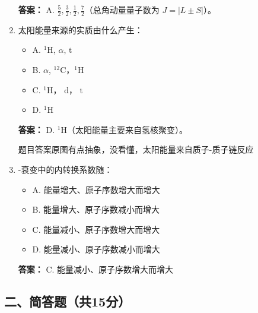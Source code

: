 \documentclass{article}
\begin{document}
\begin{enumerate}[label=\arabic*.]
    \textbf{答案：} A. $\frac{5}{2}, \frac{3}{2}, \frac{1}{2}, \frac{7}{2}$（总角动量量子数为 \( J = |L \pm S| \)）。
    
    \item 太阳能量来源的实质由什么产生：
    \begin{itemize}[label={},leftmargin=2em]
        \item A. $^1\text{H}$, $\alpha$, $\text{t}$
        \item B. $\alpha$, $^{12}\text{C}$，$^1\text{H}$ 
        \item C. $^1\text{H}$， $\text{d}$， $\text{t}$
        \item D. $^1\text{H}$
    \end{itemize}
    
    \textbf{答案：} D. $^1\text{H}$（太阳能量主要来自氢核聚变）。
    
    题目答案原图有点抽象，没看懂，太阳能量来自质子-质子链反应

    
    \item \textgamma-衰变中的内转换系数随：
    \begin{itemize}[label={},leftmargin=2em]
        \item A. 能量增大、原子序数增大而增大 
        \item B. 能量增大、原子序数减小而增大
        \item C. 能量减小、原子序数增大而增大 
        \item D. 能量减小、原子序数减小而增大
    \end{itemize}
    
    \textbf{答案：} C. 能量减小、原子序数增大而增大
\end{enumerate}

\subsection*{二、简答题（共15分）}
\end{document}
